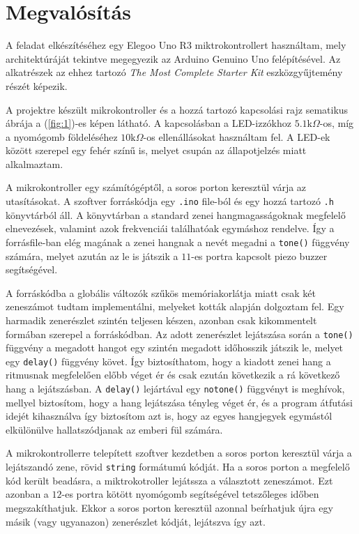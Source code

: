 \documentclass[12pt, a4paper]{article}
\begin{document}
\section{Megvalósítás}
A feladat elkészítéséhez egy Elegoo Uno R3 miktrokontrollert használtam, mely architektúráját tekintve megegyezik az Arduino Genuino Uno felépítésével. Az alkatrészek az ehhez tartozó \emph{The Most Complete Starter Kit} eszközgyűjtemény részét képezik. \par
A projektre készült mikrokontroller és a hozzá tartozó kapcsolási rajz sematikus ábrája a (\ref{fig:1})-es képen látható. A kapcsolásban a LED-izzókhoz $5.1 \text{k} \Omega$-os, míg a nyomógomb földeléséhez $10 \text{k} \Omega$-os ellenállásokat használtam fel. A LED-ek között szerepel egy fehér színű is, melyet csupán az állapotjelzés miatt alkalmaztam. \par
A mikrokontroller egy számítógéptől, a soros porton keresztül várja az utasításokat. A szoftver forráskódja egy \texttt{.ino} file-ból és egy hozzá tartozó \texttt{.h} könyvtárból áll. A könyvtárban a standard zenei hangmagasságoknak megfelelő elnevezések, valamint azok frekvenciái találhatóak egymáshoz rendelve. Így a forrásfile-ban elég magának a zenei hangnak a nevét megadni a \texttt{tone()} függvény számára, melyet azután az le is játszik a $11$-es portra kapcsolt piezo buzzer segítségével. \par
A forráskódba a globális változók szűkös memóriakorlátja miatt csak két zeneszámot tudtam implementálni, melyeket kották alapján dolgoztam fel. Egy harmadik zenerészlet szintén teljesen készen, azonban csak kikommentelt formában szerepel a forráskódban. Az adott zenerészlet lejátszása során a \texttt{tone()} függvény a megadott hangot egy szintén megadott időhosszik játszik le, melyet egy \texttt{delay()} függvény követ. Így biztosíthatom, hogy a kiadott zenei hang a ritmusnak megfelelően előbb véget ér és csak ezután következik a rá következő hang a lejátszásban. A \texttt{delay()} lejártával egy \texttt{notone()} függvényt is meghívok, mellyel biztosítom, hogy a hang lejátszása tényleg véget ér, és a program átfutási idejét kihasználva így biztosítom azt is, hogy az egyes hangjegyek egymástól elkülönülve hallatszódjanak az emberi fül számára. \par
A mikrokontrollerre telepített szoftver kezdetben a soros porton keresztül várja a lejátszandó zene, rövid \texttt{string} formátumú kódját. Ha a soros porton a megfelelő kód került beadásra, a miktrokotroller lejátssza a választott zeneszámot. Ezt azonban a $12$-es portra kötött nyomógomb segítségével tetszőleges időben megszakíthatjuk. Ekkor a soros porton keresztül azonnal beírhatjuk újra egy másik (vagy ugyanazon) zenerészlet kódját, lejátszva így azt.
\end{document}
